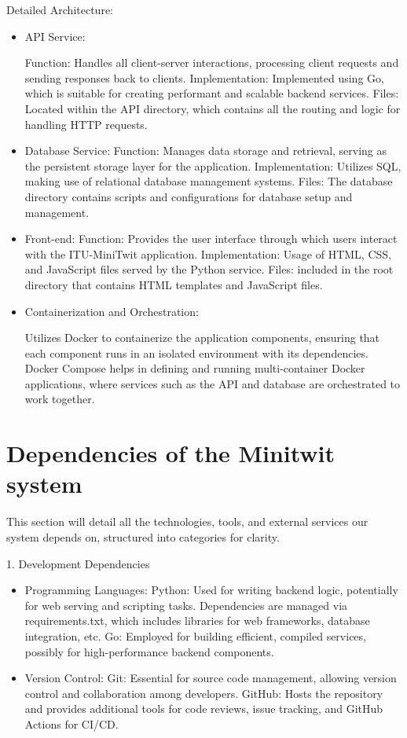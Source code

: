 \documentclass[12pt, a4paper, oneside]{book}
\begin{document}
\begin{spacing}{1.5}
Detailed Architecture:

\begin{itemize}

\item API Service:

    \subitem Function: Handles all client-server interactions, processing client requests and sending responses back to clients.
    \subitem Implementation: Implemented using Go, which is suitable for creating performant and scalable backend services.
    \subitem Files: Located within the API directory, which contains all the routing and logic for handling HTTP requests.
\item Database Service:
    \subitem Function: Manages data storage and retrieval, serving as the persistent storage layer for the application.
    \subitem Implementation: Utilizes SQL, making use of relational database management systems.
    \subitem Files: The database directory contains scripts and configurations for database setup and management.
\item Front-end:
    \subitem Function: Provides the user interface through which users interact with the ITU-MiniTwit application.
    \subitem Implementation: Usage of HTML, CSS, and JavaScript files served by the Python service.
    \subitem Files: included in the root directory that contains HTML templates and JavaScript files.
\item Containerization and Orchestration:

    \subitem Utilizes Docker to containerize the application components, ensuring that each component runs in an isolated environment with its dependencies.
    \subitem Docker Compose helps in defining and running multi-container Docker applications, where services such as the API and database are orchestrated to work together.
\end{itemize}


\section{Dependencies of the Minitwit system}


This section will detail all the technologies, tools, and external services our system depends on, structured into categories for clarity.

1. Development Dependencies

\begin{itemize}
 
\item   Programming Languages:
    \subitem   Python: Used for writing backend logic, potentially for web serving and scripting tasks. Dependencies are managed via requirements.txt, which includes libraries for web frameworks, database integration, etc.
    \subitem Go: Employed for building efficient, compiled services, possibly for high-performance backend components. 
\item Version Control:
    \subitem Git: Essential for source code management, allowing version control and collaboration among developers.
    \subitem GitHub: Hosts the repository and provides additional tools for code reviews, issue tracking, and GitHub Actions for CI/CD.


\end{itemize}
\end{spacing}
\end{document}
